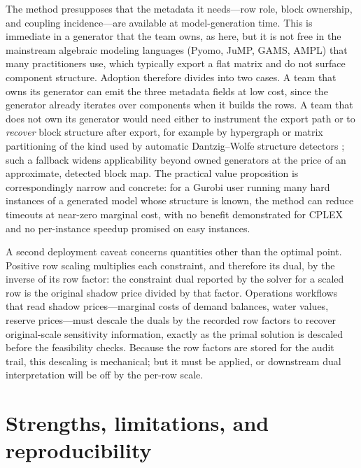 \documentclass[AMA,Times1COL]{WileyNJDv5} %
\providecommand{\DIFadd}[1]{{\protect\color{blue} \sf #1}} %
\providecommand{\DIFaddend}{} %
\begin{document}
\DIFadd{The method presupposes that the metadata it needs---row role, block ownership, and coupling
incidence---are available at model-generation time. This is immediate in a generator that
the team owns, as here, but it is not free in the mainstream algebraic modeling languages
(Pyomo, JuMP, GAMS, AMPL) that many practitioners use, which typically export a flat matrix
and do not surface component structure. Adoption therefore divides into two cases. A team
that owns its generator can emit the three metadata fields at low cost, since the generator
already iterates over components when it builds the rows. A team that does not own its
generator would need either to instrument the export path or to \emph{recover} block
structure after export, for example by hypergraph or matrix partitioning of the kind used by
automatic Dantzig--Wolfe structure detectors \cite{bergner2015automatic}; such a fallback widens applicability beyond
owned generators at the price of an approximate, detected block map. The practical value
proposition is correspondingly narrow and concrete: for a Gurobi user running many hard
instances of a generated model whose structure is known, the method can reduce timeouts at
near-zero marginal cost, with no benefit demonstrated for CPLEX and no per-instance speedup
promised on easy instances.
}

\DIFadd{A second deployment caveat concerns quantities other than the optimal point. Positive row
scaling multiplies each constraint, and therefore its dual, by the inverse of its row factor:
the constraint dual reported by the solver for a scaled row is the original shadow price
divided by that factor. Operations workflows that read shadow prices---marginal costs of
demand balances, water values, reserve prices---must descale the duals by the recorded row
factors to recover original-scale sensitivity information, exactly as the primal solution is
descaled before the feasibility checks. Because the row factors are stored for the audit
trail, this descaling is mechanical; but it must be applied, or downstream dual
interpretation will be off by the per-row scale}\DIFaddend .

\section{Strengths, limitations, and reproducibility}
\label{sec:validity}
\end{document}

